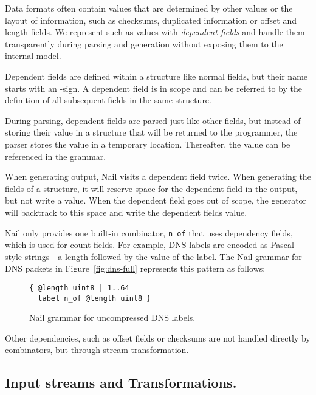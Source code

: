 Data formats often contain values that are determined by other values or the layout of information,
such as checksums, duplicated information  or offset and  length fields.
We represent such as values with \emph{dependent fields} and handle them transparently during
parsing and generation without exposing them to the internal model. 


Dependent fields are defined within a structure like normal fields, but their name starts with an \@-sign. 
A dependent field is in scope and can be referred to by the definition of all subsequent fields in the same structure.

During parsing, dependent fields are parsed just like other fields, but instead of storing their
value in a structure that will be returned to the programmer, the parser stores the value in a
temporary location. Thereafter, the value can be referenced in the grammar. 

When generating output, Nail visits a dependent field twice. When generating the fields of a
structure, it will reserve space for the dependent field in the output, but not write a value. When
the dependent field goes out of scope, the generator will backtrack to this space and write the
dependent fields value.

Nail only provides one built-in combinator, \texttt{n_of} that uses dependency fields, which is used
for count fields. For example, DNS labels are encoded as Pascal-style strings - a length followed by
the value of the label. The Nail grammar for DNS packets in Figure~\ref{fig:dns-full} represents
this pattern as follows:

\begin{figure}[tb]
\begin{verbatim}
{ @length uint8 | 1..64
  label n_of @length uint8 }
\end{verbatim}
\caption{Nail grammar for uncompressed DNS labels.}
\end{figure}

Other dependencies, such as offset fields or checksums are not handled directly by combinators, but
through stream transformation.

\subsection{Input streams and Transformations.}



